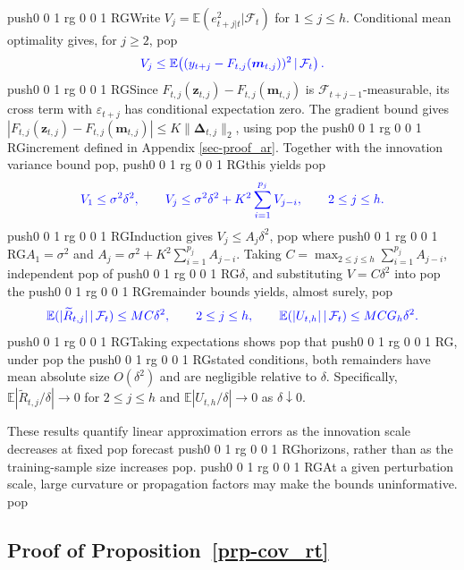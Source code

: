 \documentclass[
  american,
  12pt]{article}
\theoremstyle{plain}
\theoremstyle{plain}
\theoremstyle{remark}
\newcommand{\CPTSadd}[1]{\ifmmode\else\leavevmode\fi\pdfcolorstack 0 push{0 0 1 rg 0 0 1 RG}#1\pdfcolorstack 0 pop}
\begin{document}
\CPTSadd{Write \(V_j=\mathbb E(e_{t+j|t}^2|\mathcal F_t)\) for \(1\leq j\leq h\).
Conditional mean optimality gives, for \(j\geq2\),} \[
\CPTSadd{V_j\leq\mathbb E\!\left((y_{t+j}-F_{t,j}(\bm m_{t,j}))^2\,|\,\mathcal F_t\right).}
\] \CPTSadd{Since \(F_{t,j}(\bm z_{t,j})-F_{t,j}(\bm m_{t,j})\) is
\(\mathcal F_{t+j-1}\)-measurable, its cross term with
\(\varepsilon_{t+j}\) has conditional expectation zero. The gradient
bound gives
\(|F_{t,j}(\bm z_{t,j})-F_{t,j}(\bm m_{t,j})|\leq K\|\bm\Delta_{t,j}\|_2\),
using} the \CPTSadd{increment defined in Appendix \ref{sec-proof_ar}. Together
with the innovation variance bound}, \CPTSadd{this yields} \[
\CPTSadd{V_1\leq\sigma^2\delta^2,\qquad
V_j\leq\sigma^2\delta^2+K^2\sum_{i=1}^{p_j}V_{j-i},\qquad 2\leq j\leq h.}
\] \CPTSadd{Induction gives \(V_j\leq A_j\delta^2\),} where \CPTSadd{\(A_1=\sigma^2\) and
\(A_j=\sigma^2+K^2\sum_{i=1}^{p_j}A_{j-i}\). Taking
\(C=\max_{2\leq j\leq h}\sum_{i=1}^{p_j}A_{j-i}\), independent} of
\CPTSadd{\(\delta\), and substituting \(V=C\delta^2\) into} the \CPTSadd{remainder bounds
yields, almost surely,} \[
\CPTSadd{\mathbb E(|\widetilde R_{t,j}|\,|\,\mathcal F_t)\leq MC\delta^2,\qquad 2\leq j\leq h,
\qquad
\mathbb E(|U_{t,h}|\,|\,\mathcal F_t)\leq MCG_h\delta^2.}
\] \CPTSadd{Taking expectations shows} that\CPTSadd{, under} the \CPTSadd{stated conditions, both
remainders have mean absolute size \(O(\delta^2)\) and are negligible
relative to \(\delta\). Specifically,
\(\mathbb E|\widetilde R_{t,j}/\delta|\to0\) for \(2\leq j\leq h\) and
\(\mathbb E|U_{t,h}/\delta|\to0\) as \(\delta\downarrow0\).

These results quantify linear approximation errors as the innovation
scale decreases at fixed} forecast \CPTSadd{horizons, rather than as the
training-sample size increases}. \CPTSadd{At a given perturbation scale, large
curvature or propagation factors may make the bounds uninformative.}

\subsection{\texorpdfstring{Proof of
Proposition~\ref{prp-cov_rt}}{Proof of Proposition~}}\label{sec-proof_cov_rt}
\end{document}

